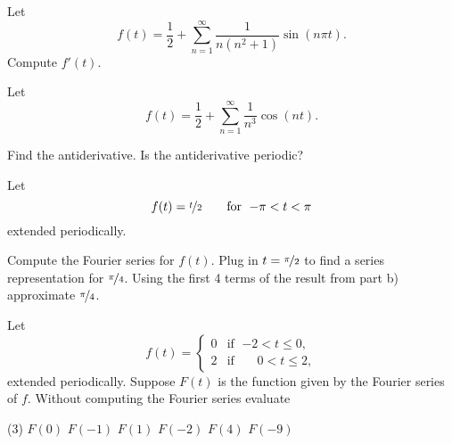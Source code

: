\begin{exercise}
Let
\begin{equation*}
f(t) = \frac{1}{2} + \sum_{n=1}^\infty
\frac{1}{n(n^2+1)}
\sin(n\pi t) .
\end{equation*}
Compute $f'(t)$.
\end{exercise}

\begin{exercise}
\pagebreak[2]
Let
\begin{equation*}
f(t) = \frac{1}{2} + \sum_{n=1}^\infty
\frac{1}{n^3}
\cos(n t) .
\end{equation*}
\begin{tasks}
\task Find the antiderivative.
\task Is the antiderivative periodic?
\end{tasks}
\end{exercise}

\begin{exercise}
Let
\begin{equation*}
f(t) = \nicefrac{t}{2} \qquad \text{for } \; {-\pi} < t < \pi
\end{equation*}
extended periodically.
\begin{tasks}
\task Compute the Fourier series for $f(t)$.
\task Plug in $t=\nicefrac{\pi}{2}$ to find a series representation
for $\nicefrac{\pi}{4}$.
\task Using the first 4 terms of the result from part b) approximate
$\nicefrac{\pi}{4}$.
\end{tasks}
\end{exercise}

\begin{exercise}
Let
\begin{equation*}
f(t) = 
\begin{cases}
0 & \text{if } \; {-2} < t \leq 0, \\
2 & \text{if } \; \phantom{-}0 < t \leq 2,
\end{cases}
\end{equation*}
extended periodically.  Suppose $F(t)$ is the function given
by the Fourier series of $f$.  Without computing the Fourier series
evaluate
\begin{tasks}(3)
\task $F(0)$
\task $F(-1)$
\task $F(1)$
\task $F(-2)$
\task $F(4)$
\task $F(-9)$
\end{tasks}
\end{exercise}

